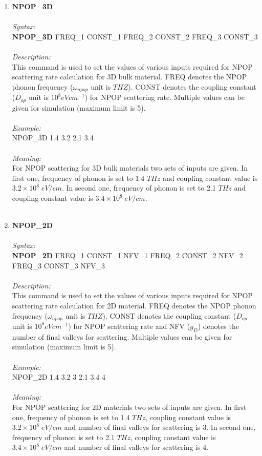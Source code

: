 \documentclass[12pt]{article}
\begin{document}
\begin{enumerate}
    \item \textbf{NPOP\_3D}   \\ \\
    \textit{Syntax:} \\
    \textbf{NPOP\_3D} FREQ\_1 CONST\_1 FREQ\_2 CONST\_2 FREQ\_3 CONST\_3 \\ \\
    \textit{Description:} \\
    This command is used to set the values of various inputs required for NPOP scattering rate calculation for 3D bulk material. FREQ denotes the NPOP phonon frequency ($\omega_{npop}$ unit is $THZ$). CONST denotes the coupling constant ($D_{op}$ unit is $10^8 eV cm^{-1}$) for NPOP scattering rate. Multiple values can be given for simulation (maximum limit is 5). \\ \\
    \textit{Example:} \\
    NPOP\_3D 1.4 3.2 2.1 3.4 \\ \\
    \textit{Meaning:} \\   
    For NPOP scattering for 3D bulk materials two sets of inputs are given. In first one, frequency of phonon is set to 1.4 $THz$ and coupling constant value is $3.2 \times 10^{8} \; eV/cm$. In second one, frequency of phonon is set to 2.1 $THz$ and coupling constant value is $3.4 \times 10^{8} \; eV/cm$. \\ \\     
    \item \textbf{NPOP\_2D}   \\ \\
    \textit{Syntax:} \\
    \textbf{NPOP\_2D} FREQ\_1 CONST\_1 NFV\_1 FREQ\_2 CONST\_2 NFV\_2 FREQ\_3 CONST\_3 NFV\_3 \\ \\
    \textit{Description:} \\
    This command is used to set the values of various inputs required for NPOP scattering rate calculation for 2D material. FREQ denotes the NPOP phonon frequency ($\omega_{npop}$ unit is $THZ$). CONST denotes the coupling constant ($D_{op}$ unit is $10^8 eV cm^{-1}$) for NPOP scattering rate and NFV ($g_D$) denotes the number of final valleys for scattering. Multiple values can be given for simulation (maximum limit is 5). \\ \\
    \textit{Example:} \\
    NPOP\_2D 1.4 3.2 3 2.1 3.4 4  \\ \\
    \textit{Meaning:} \\  
    For NPOP scattering for 2D materials two sets of inputs are given. In first one, frequency of phonon is set to 1.4 $THz$, coupling constant value is $3.2 \times 10^{8} \; eV/cm$ and number of final valleys for scattering is 3. In second one, frequency of phonon is set to 2.1 $THz$, coupling constant value is $3.4 \times 10^{8} \; eV/cm$ and number of final valleys for scattering is 4.    \\ \\
    

\end{enumerate}
\end{document}

